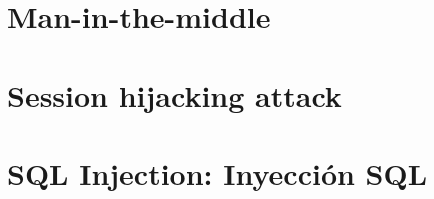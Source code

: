 \documentclass[10pt, a4paper,spanish]{article}
\begin{document}
    \section{Man-in-the-middle}
        \paragraph{}


    \section{Session hijacking attack}
        \paragraph{}


    \section{SQL Injection: Inyección SQL}
        \paragraph{}
\end{document}
